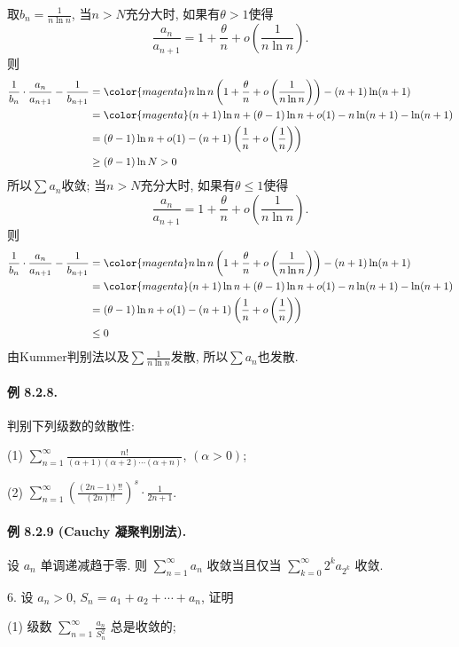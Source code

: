 取$b_{n}=\frac{1}{n\ln n}$, 当$n>N$充分大时, 如果有$\theta>1$使得
\[
\frac{a_{n}}{a_{n+1}}=1+\frac{\theta}{n}+o\left(\frac{1}{n\ln n}\right).
\]
则
\begin{align*}
	\frac{1}{b_{n}}\cdot\frac{a_{n}}{a_{n+1}}-\frac{1}{b_{n+1}} & ={\color{magenta}n\ln n\left(1+\frac{\theta}{n}+o\left(\frac{1}{n\ln n}\right)\right)}-(n+1)\ln(n+1)\\
	& ={\color{magenta}(n+1)\ln n+(\theta-1)\ln n+o(1)}-n\ln(n+1)-\ln(n+1)\\
	& =(\theta-1)\ln n+o(1)-(n+1)\left(\frac{1}{n}+o\left(\frac{1}{n}\right)\right)\\
	& \ge(\theta-1)\ln N>0
\end{align*}
所以$\sum a_{n}$收敛; 当$n>N$充分大时, 如果有$\theta\le1$使得
\[
\frac{a_{n}}{a_{n+1}}=1+\frac{\theta}{n}+o\left(\frac{1}{n\ln n}\right).
\]
则
\begin{align*}
	\frac{1}{b_{n}}\cdot\frac{a_{n}}{a_{n+1}}-\frac{1}{b_{n+1}} & ={\color{magenta}n\ln n\left(1+\frac{\theta}{n}+o\left(\frac{1}{n\ln n}\right)\right)}-(n+1)\ln(n+1)\\
	& ={\color{magenta}(n+1)\ln n+(\theta-1)\ln n+o(1)}-n\ln(n+1)-\ln(n+1)\\
	& =(\theta-1)\ln n+o(1)-(n+1)\left(\frac{1}{n}+o\left(\frac{1}{n}\right)\right)\\
	& \le0
\end{align*}
由Kummer判别法以及$\sum\frac{1}{n\ln n}$发散, 所以$\sum a_{n}$也发散.

\paragraph{例 8.2.8. }

判别下列级数的敛散性: 

(1) $\sum_{n=1}^{\infty}\frac{n!}{(\alpha+1)(\alpha+2)\cdots(\alpha+n)}$,
$(\alpha>0)$; 

(2) $\sum_{n=1}^{\infty}\left(\frac{(2n-1)!!}{(2n)!!}\right)^{s}\cdot\frac{1}{2n+1}$.

\paragraph{例 8.2.9 (Cauchy 凝聚判别法). }

设 $a_{n}$ 单调递减趋于零. 则 $\sum_{n=1}^{\infty}a_{n}$ 收敛当且仅当 $\sum_{k=0}^{\infty}2^{k}a_{2^{k}}$
收敛.

6. 设 $a_{n}>0$, $S_{n}=a_{1}+a_{2}+\cdots+a_{n}$, 证明 

(1) 级数 $\sum_{n=1}^{\infty}\frac{a_{n}}{S_{n}^{2}}$ 总是收敛的; 

